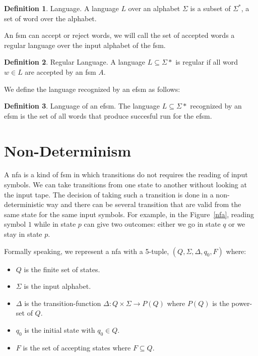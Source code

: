 \documentclass[12pt]{article}
\theoremstyle{definition}
\newtheorem{definition}{Definition}[section]
\theoremstyle{definition}
\theoremstyle{remark}
\begin{document}
\theoremstyle{definition}
\begin{definition}{Language.} A language $L$ over an alphabet $\Sigma$ is a subset of $\Sigma^*$, a set of word over the alphabet.
\end{definition}

An \gls{fsm} can accept or reject words, we will call the set of accepted words a regular language over the input alphabet of the \gls{fsm}.

\theoremstyle{definition}
\begin{definition}{Regular Language.} A language $L \subseteq \Sigma*$ is regular if all word $w \in L$ are accepted by an \gls{fsm} $A$.~\cite{Yu:1997:RL:267846.267848}
\end{definition}

We define the language recognized by an \gls{efsm} as follows:
\theoremstyle{definition}
\begin{definition}{Language of an \gls{efsm}.} The language $L \subseteq \Sigma*$ recognized by an \gls{efsm} is the set of all words that produce succesful run for the \gls{efsm}.
\end{definition}



\section{Non-Determinism}


A \gls{nfa} is a kind of \gls{fsm} in which transitions do not requires the reading of input symbols. We can take transitions from one state to another without looking at the input tape. The decision of taking such a transition is done in a non-deterministic way and there can be several transition that are valid from the same state for the same input symbols. For example, in the Figure~\ref{nfa}, reading symbol $1$ while in state $p$ can give two outcomes: either we go in state $q$ or we stay in state $p$.~\cite{FA-DecisionProblems:1959}

Formally speaking, we represent a \gls{nfa} with a 5-tuple, $(Q, \Sigma, \Delta, q_0, F)$ where:

\begin{itemize}
\item $Q$ is the finite set of states.
\item $\Sigma$ is the input alphabet.
\item $\Delta$ is the transition-function $\Delta: Q \times \Sigma \rightarrow P(Q)$ where $P(Q)$ is the power-set of $Q$.
\item $q_0$ is the initial state with $q_0 \in Q$.
\item $F$ is the set of accepting states where $F \subseteq Q$.
\end{itemize}
\end{document}
